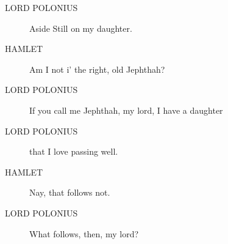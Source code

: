 \documentclass{article}
\begin{document}
\begin{description}
            
\item[LORD POLONIUS] 
               Aside  Still on my daughter.
\end{description}
          
\begin{description}
            
\item[HAMLET] Am I not i' the right, old Jephthah?
\end{description}
          
\begin{description}
            
\item[LORD POLONIUS] If you call me Jephthah, my lord, I have a daughter
\item[LORD POLONIUS] that I love passing well.
\end{description}
          
\begin{description}
            
\item[HAMLET] Nay, that follows not.
\end{description}
          
\begin{description}
            
\item[LORD POLONIUS] What follows, then, my lord?
\end{description}
          
\end{document}

